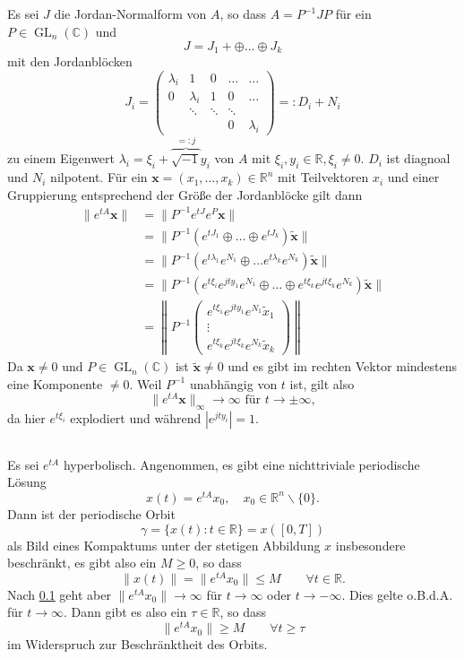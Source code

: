 \documentclass[a4paper]{article}
\DeclareMathOperator{\gl}{GL}
\begin{document}
\subsection{}\label{aufg:3.1}
Es sei $J$ die Jordan-Normalform von $A$, so dass $A = P^{-1} J P$ für ein $P\in \gl_n(ℂ)$ und
$$J = J_1 + \oplus … \oplus J_k$$
mit den Jordanblöcken
$$J_i = \begin{pmatrix}
λ_i & 1  & 0 & … & … \\
0   & λ_i& 1 & 0 & … \\
    &   \ddots  & \ddots & \ddots & \\
    &    &    & 0 & λ_i
\end{pmatrix} =: D_i + N_i$$
zu einem Eigenwert $λ_i = ξ_i +\overbrace{ \sqrt{-1} }^{=:j} y_i$ von $A$ mit $ξ_i,y_i \in ℝ, ξ_i \ne 0$. $D_i$ ist diagnoal und $N_i$ nilpotent.
Für ein $\symbf x = (x_1, …, x_k)\in ℝ^n$ mit Teilvektoren $x_i$ und einer Gruppierung entsprechend der Größe der Jordanblöcke gilt dann
\begin{align*}
    \| e^{tA} \symbf x \| &= \| P^{-1} e^{tJ} e^{P} \symbf x \| \\
     &= \| P^{-1} \left( e^{tJ_1} \oplus … \oplus e^{tJ_k} \right) \tilde{\symbf {x}} \| \\
      &= \| P^{-1} \left( e^{tλ_1} e^{N_1} \oplus … e^{tλ_k} e^{N_k} \right) \tilde{\symbf x} \| \\
    &= \| P^{-1} \left( e^{tξ_i}e^{jty_1} e^{N_1} \oplus … \oplus e^{tξ_k}e^{jtξ_k}e^{N_k}\right) \tilde{\symbf x} \|\\
   &= \left \|P^{-1}
    \begin{pmatrix}
    e^{tξ_1}e^{jty_1} e^{N_1} \tilde x_1\\
    \vdots \\
    e^{tξ_k}e^{jtξ_k}e^{N_k} \tilde x_k
    \end{pmatrix}\right\|
\end{align*}
Da $\symbf x\ne 0$ und $P\in \gl_n(ℂ)$ ist $\tilde{\symbf x}\ne 0$ und es gibt im rechten Vektor mindestens eine Komponente $\ne 0$. Weil $P^{-1}$ unabhängig von $t$ ist, gilt also
$$\| e^{tA} \symbf x\|_∞ \to \infty \text{ für $t\to \pm \infty$},$$
da hier $e^{tξ_i}$ explodiert und während $|e^{jty_i}|=1$.

\subsection{}
Es sei $e^{tA}$ hyperbolisch.
Angenommen, es gibt eine nichttriviale periodische Lösung 
$$x(t) = e^{tA}x_0, \quad x_0\in ℝ^n\smallsetminus \{0\}.$$
Dann ist der periodische Orbit 
$$γ = \{ x(t) : t\in ℝ \} = x( [0,T] )$$
als Bild eines Kompaktums unter der stetigen Abbildung $x$ insbesondere beschränkt, es gibt also ein $M\ge 0$, so dass
$$\| x(t) \| = \| e^{tA} x_0 \| \le M \qquad  ∀t\in ℝ.$$
Nach \ref{aufg:3.1} geht aber $ \| e^{tA} x_0 \| \to \infty$ für $t \to \infty$ oder $t\to -\infty$. Dies gelte o.B.d.A. für $t\to \infty$. Dann gibt es also ein $τ\in ℝ$, so dass
$$\| e^{tA} x_0 \| \ge M \qquad ∀t\ge τ$$
im Widerspruch zur Beschränktheit des Orbits.
\end{document}
